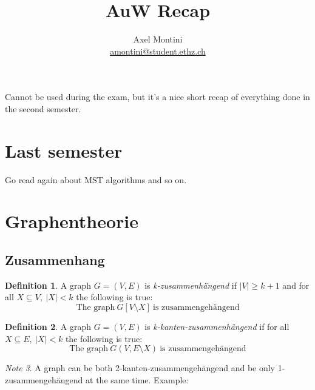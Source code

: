 \documentclass[12pt]{extarticle}
\title{AuW Recap}
\author{
    Axel Montini
    \\
    \href{mailto:amontini@student.ethz.ch}{amontini@student.ethz.ch}
}
\theoremstyle{definition}
\newtheorem{definition}{Definition}[section]
\theoremstyle{remark}
\newtheorem{note}[definition]{Note}
\theoremstyle{plain}
\theoremstyle{plain}
\theoremstyle{plain}
\begin{document}
\maketitle

Cannot be used during the exam, but it's a nice short recap of everything done in the second semester.

\section{Last semester}
Go read again about MST algorithms and so on.

\section{Graphentheorie}

\subsection{Zusammenhang}
\begin{definition}
    A graph $G=(V,E)$ is \textit{k-zusammenhängend} if $|V| \ge k + 1$ and
    for all $X \subseteq V,\ |X| < k$ the following is true:
    \[ \mbox{The graph}\ G[V \setminus X]\ \mbox{is zusammengehängend} \]
\end{definition}

\begin{definition}
    A graph $G=(V,E)$ is \textit{k-kanten-zusammenhängend} if
    for all $X \subseteq E,\ |X| < k$ the following is true:
    \[ \mbox{The graph}\ G(V, E \setminus X)\ \mbox{is zusammengehängend} \]
\end{definition}

\begin{note}
    A graph can be both 2-kanten-zusammengehängend and be only 1-zusammengehängend at the same time.
    Example:
    \begin{figure}[H]
        \centering

    \end{figure}
\end{note}
\end{document}
